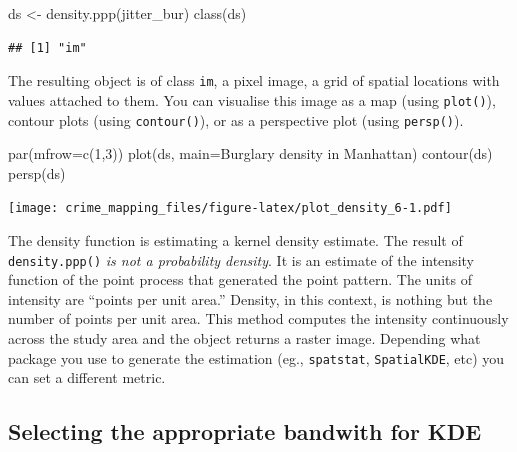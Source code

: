 \documentclass[
  krantz2]{krantz}
\makeatletter
\newenvironment{Shaded}{\begin{snugshade}}{\end{snugshade}}
\newcommand{\AttributeTok}[1]{\textcolor[rgb]{0.61,0.61,0.61}{#1}}
\newcommand{\DecValTok}[1]{\textcolor[rgb]{0.06,0.06,0.06}{#1}}
\newcommand{\FunctionTok}[1]{\textcolor[rgb]{0,0,0}{#1}}
\newcommand{\NormalTok}[1]{#1}
\newcommand{\OtherTok}[1]{\textcolor[rgb]{0.37,0.37,0.37}{#1}}
\newcommand{\StringTok}[1]{\textcolor[rgb]{0.5,0.5,0.5}{#1}}
\newenvironment{kframe}{%
\medskip{}
\setlength{\fboxsep}{.8em}
 \def\at@end@of@kframe{}%
 \ifinner\ifhmode%
  \def\at@end@of@kframe{\end{minipage}}%
  \begin{minipage}{\columnwidth}%
 \fi\fi%
 \def\FrameCommand##1{\hskip\@totalleftmargin \hskip-\fboxsep
 \colorbox{shadecolor}{##1}\hskip-\fboxsep
     \hskip-\linewidth \hskip-\@totalleftmargin \hskip\columnwidth}%
 \MakeFramed {\advance\hsize-\width
   \@totalleftmargin\z@ \linewidth\hsize
   \@setminipage}}%
 {\par\unskip\endMakeFramed%
 \at@end@of@kframe}
\renewenvironment{Shaded}{\begin{kframe}}{\end{kframe}}
\makeatother
\begin{document}
\begin{Shaded}
\begin{Highlighting}[]
\NormalTok{ds }\OtherTok{\textless{}{-}} \FunctionTok{density.ppp}\NormalTok{(jitter\_bur)}
\FunctionTok{class}\NormalTok{(ds)}
\end{Highlighting}
\end{Shaded}

\begin{verbatim}
## [1] "im"
\end{verbatim}

The resulting object is of class \texttt{im}, a pixel image, a grid of spatial locations with values attached to them. You can visualise this image as a map (using \texttt{plot()}), contour plots (using \texttt{contour()}), or as a perspective plot (using \texttt{persp()}).

\begin{Shaded}
\begin{Highlighting}[]
\FunctionTok{par}\NormalTok{(}\AttributeTok{mfrow=}\FunctionTok{c}\NormalTok{(}\DecValTok{1}\NormalTok{,}\DecValTok{3}\NormalTok{))}
\FunctionTok{plot}\NormalTok{(ds, }\AttributeTok{main=}\StringTok{\textquotesingle{}Burglary density in Manhattan\textquotesingle{}}\NormalTok{)}
\FunctionTok{contour}\NormalTok{(ds)}
\FunctionTok{persp}\NormalTok{(ds)}
\end{Highlighting}
\end{Shaded}

\texttt{[image: crime\_mapping\_files/figure-latex/plot\_density\_6-1.pdf]}

The density function is estimating a kernel density estimate. The result of \texttt{density.ppp()} \emph{is not a probability density}. It is an estimate of the intensity function of the point process that generated the point pattern. The units of intensity are ``points per unit area.'' Density, in this context, is nothing but the number of points per unit area. This method computes the intensity continuously across the study area and the object returns a raster image. Depending what package you use to generate the estimation (eg., \texttt{spatstat}, \texttt{SpatialKDE}, etc) you can set a different metric.

\hypertarget{selecting-the-appropriate-bandwith-for-kde}{%
\subsection{Selecting the appropriate bandwith for KDE}\label{selecting-the-appropriate-bandwith-for-kde}}
\end{document}
